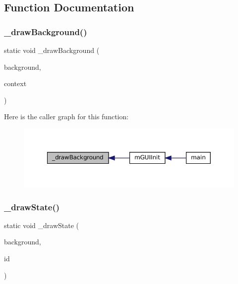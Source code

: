 \subsection{Function Documentation}
\mbox{\label{gui-runner_8c_a85eaa5595602fd13a318e9dd12bb6f50}} 
\subsubsection{\texorpdfstring{\+\_\+draw\+Background()}{\_drawBackground()}}
{\footnotesize\ttfamily static void \+\_\+draw\+Background (\begin{DoxyParamCaption}\item[{struct G\+U\+I\+Background $\ast$}]{background,  }\item[{void $\ast$}]{context }\end{DoxyParamCaption})\hspace{0.3cm}{\ttfamily [static]}}

Here is the caller graph for this function\+:
\nopagebreak
\begin{figure}[H]
\begin{center}
\leavevmode
\includegraphics[width=350pt]{gui-runner_8c_a85eaa5595602fd13a318e9dd12bb6f50_icgraph}
\end{center}
\end{figure}
\mbox{\label{gui-runner_8c_a6d8815542c91f5581f48b3c11ced7d14}} 
\subsubsection{\texorpdfstring{\+\_\+draw\+State()}{\_drawState()}}
{\footnotesize\ttfamily static void \+\_\+draw\+State (\begin{DoxyParamCaption}\item[{struct G\+U\+I\+Background $\ast$}]{background,  }\item[{void $\ast$}]{id }\end{DoxyParamCaption})\hspace{0.3cm}{\ttfamily [static]}}

